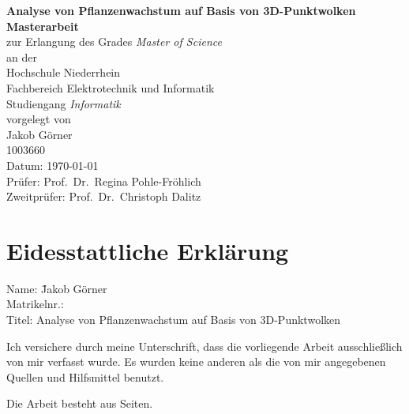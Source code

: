 \documentclass[12pt,titlepage, twoside]{article}
\begin{document}
\begin{titlepage}
\begin{center}
{\Large\bf Analyse von Pflanzenwachstum auf Basis von 3D-Punktwolken}\\[3cm]

{\bf Masterarbeit}\\
zur Erlangung des Grades {\em Master of Science}\\[1.5cm]

an der\\
Hochschule Niederrhein\\
Fachbereich Elektrotechnik und Informatik\\
Studiengang {\em Informatik}\\[3cm]

vorgelegt von\\
Jakob Görner\\
1003660\\[3cm]
Datum: \today\\[3cm]

Prüfer: Prof.~Dr.~Regina Pohle-Fröhlich\\
Zweitprüfer: Prof.~Dr.~Christoph Dalitz

\end{center}
\end{titlepage}

\pagestyle{empty}
\cleardoublepage

\newpage


\section*{Eidesstattliche Erklärung}
\begin{tabbing}
Name: \hspace{4em}\= Jakob Görner\\
Matrikelnr.: \\
Titel: \> Analyse von Pflanzenwachstum auf Basis von 3D-Punktwolken
\end{tabbing}

Ich versichere durch meine Unterschrift, dass die vorliegende
Arbeit ausschließlich von mir verfasst wurde.
Es wurden keine anderen als die von mir angegebenen Quellen und Hilfsmittel
benutzt.

Die Arbeit besteht aus \pageref{LastPage} Seiten.
\end{document}

